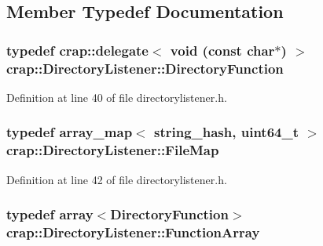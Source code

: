 \subsection{Member Typedef Documentation}
\hypertarget{classcrap_1_1_directory_listener_a9a91cdc5d0463096540cc63b5bd05263}{}
\subsubsection[{Directory\+Function}]{\setlength{\rightskip}{0pt plus 5cm}typedef {\bf crap\+::delegate}$<$ void (const char$\ast$) $>$ {\bf crap\+::\+Directory\+Listener\+::\+Directory\+Function}}\label{classcrap_1_1_directory_listener_a9a91cdc5d0463096540cc63b5bd05263}


Definition at line 40 of file directorylistener.\+h.

\hypertarget{classcrap_1_1_directory_listener_a6988f65f8f21698999b7ce9293f79c6d}{}
\subsubsection[{File\+Map}]{\setlength{\rightskip}{0pt plus 5cm}typedef {\bf array\+\_\+map}$<$ {\bf string\+\_\+hash}, uint64\+\_\+t $>$ {\bf crap\+::\+Directory\+Listener\+::\+File\+Map}}\label{classcrap_1_1_directory_listener_a6988f65f8f21698999b7ce9293f79c6d}


Definition at line 42 of file directorylistener.\+h.

\hypertarget{classcrap_1_1_directory_listener_a8a9545bc47aa34933aaf0b18713bd47f}{}
\subsubsection[{Function\+Array}]{\setlength{\rightskip}{0pt plus 5cm}typedef {\bf array}$<${\bf Directory\+Function}$>$ {\bf crap\+::\+Directory\+Listener\+::\+Function\+Array}}\label{classcrap_1_1_directory_listener_a8a9545bc47aa34933aaf0b18713bd47f}


